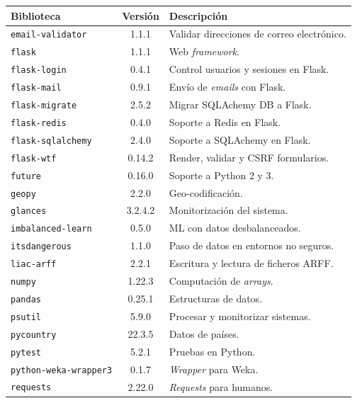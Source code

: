 \begin{table}[p]
\centering
\begin{tabular}{lcl}
	\toprule
	\textbf{Biblioteca} & \textbf{Versión} & \textbf{Descripción}\\
	\midrule
	\rowcolor[HTML]{EFEFEF} 
	\texttt{email-validator} & 1.1.1 & Validar direcciones de correo electrónico.\\
	\texttt{flask} & 1.1.1 & Web \textit{framework}.\\ \rowcolor[HTML]{EFEFEF}
	\texttt{flask-login} & 0.4.1 & Control usuarios y sesiones en Flask.\\
	\texttt{flask-mail} & 0.9.1 & Envío de \textit{emails} con Flask.\\ \rowcolor[HTML]{EFEFEF}
	\texttt{flask-migrate} & 2.5.2 & Migrar SQLAchemy DB a Flask.\\
	\texttt{flask-redis} & 0.4.0 & Soporte a Redis en Flask.\\ \rowcolor[HTML]{EFEFEF}
	\texttt{flask-sqlalchemy} & 2.4.0 & Soporte a SQLAchemy en Flask.\\
	\texttt{flask-wtf} & 0.14.2 & Render, validar y CSRF formularios.\\ \rowcolor[HTML]{EFEFEF}
	\texttt{future} & 0.16.0 & Soporte a Python 2 y 3.\\ 
	\texttt{geopy} & 2.2.0 & Geo-codificación.\\ \rowcolor[HTML]{EFEFEF}
	\texttt{glances} & 3.2.4.2 & Monitorización del sistema.\\ 
	\texttt{imbalanced-learn} & 0.5.0 & ML con datos desbalanceados.\\ \rowcolor[HTML]{EFEFEF}
	\texttt{itsdangerous} & 1.1.0 & Paso de datos en entornos no seguros.\\
	\texttt{liac-arff} & 2.2.1 & Escritura y lectura de ficheros ARFF.\\ \rowcolor[HTML]{EFEFEF}
	\texttt{numpy} & 1.22.3 & Computación de \textit{arrays}.\\
	\texttt{pandas} & 0.25.1 & Estructuras de datos.\\ \rowcolor[HTML]{EFEFEF}
	\texttt{psutil} & 5.9.0 & Procesar y monitorizar sistemas.\\
	\texttt{pycountry} & 22.3.5 & Datos de países.\\ \rowcolor[HTML]{EFEFEF}
	\texttt{pytest} & 5.2.1 & Pruebas en Python.\\
	\texttt{python-weka-wrapper3} & 0.1.7 & \textit{Wrapper} para Weka.\\ \rowcolor[HTML]{EFEFEF}
	\texttt{requests} & 2.22.0 & \textit{Requests} para humanos.\\

\end{tabular}
\end{table}
